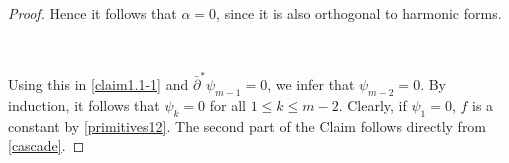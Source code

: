 \documentclass[10pt,a4paper]{amsart}
\newcommand{\sbpartial}{\bar{\partial}^*}
\numberwithin{equation}{section}
\begin{document}
\begin{proof}
Hence it follows that $\alpha = 0$, since it is also orthogonal to harmonic forms. 

\



Using this in \eqref{claim1.1-1} and $\sbpartial \psi_{m-1} =0$, we infer that $\psi_{m-2} = 0$. By induction, it follows that $\psi_{k} =0$ for all $1 \leq  k \leq m-2$. Clearly, if $\psi_1 = 0$, $f$ is a constant by \eqref{primitives12}. The second part of the Claim follows directly from  \eqref{cascade}.











   
\end{proof}
\end{document}
